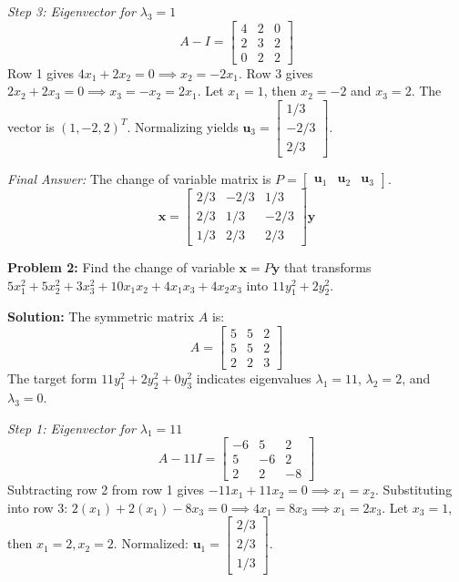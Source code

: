 \documentclass[11pt, letterpaper]{article}
\theoremstyle{definition}
\theoremstyle{remark}
\begin{document}
\textit{Step 3: Eigenvector for $\lambda_3 = 1$}
\[ A - I = \begin{bmatrix} 4 & 2 & 0 \\ 2 & 3 & 2 \\ 0 & 2 & 2 \end{bmatrix} \]
Row 1 gives $4x_1 + 2x_2 = 0 \implies x_2 = -2x_1$. Row 3 gives $2x_2 + 2x_3 = 0 \implies x_3 = -x_2 = 2x_1$. Let $x_1 = 1$, then $x_2 = -2$ and $x_3 = 2$. The vector is $(1, -2, 2)^T$. Normalizing yields $\mathbf{u}_3 = \begin{bmatrix} 1/3 \\ -2/3 \\ 2/3 \end{bmatrix}$.

\textit{Final Answer:} The change of variable matrix is $P = \begin{bmatrix} \mathbf{u}_1 & \mathbf{u}_2 & \mathbf{u}_3 \end{bmatrix}$.
\[ \mathbf{x} = \begin{bmatrix} 2/3 & -2/3 & 1/3 \\ 2/3 & 1/3 & -2/3 \\ 1/3 & 2/3 & 2/3 \end{bmatrix} \mathbf{y} \]

\vspace{1em}
\textbf{Problem 2:} Find the change of variable $\mathbf{x} = P\mathbf{y}$ that transforms $5x_1^2 + 5x_2^2 + 3x_3^2 + 10x_1x_2 + 4x_1x_3 + 4x_2x_3$ into $11y_1^2 + 2y_2^2$.

\textbf{Solution:}
The symmetric matrix $A$ is:
\[ A = \begin{bmatrix} 5 & 5 & 2 \\ 5 & 5 & 2 \\ 2 & 2 & 3 \end{bmatrix} \]
The target form $11y_1^2 + 2y_2^2 + 0y_3^2$ indicates eigenvalues $\lambda_1 = 11$, $\lambda_2 = 2$, and $\lambda_3 = 0$.

\textit{Step 1: Eigenvector for $\lambda_1 = 11$}
\[ A - 11I = \begin{bmatrix} -6 & 5 & 2 \\ 5 & -6 & 2 \\ 2 & 2 & -8 \end{bmatrix} \]
Subtracting row 2 from row 1 gives $-11x_1 + 11x_2 = 0 \implies x_1 = x_2$. Substituting into row 3: $2(x_1) + 2(x_1) - 8x_3 = 0 \implies 4x_1 = 8x_3 \implies x_1 = 2x_3$. Let $x_3 = 1$, then $x_1 = 2, x_2 = 2$. Normalized: $\mathbf{u}_1 = \begin{bmatrix} 2/3 \\ 2/3 \\ 1/3 \end{bmatrix}$.
\end{document}
